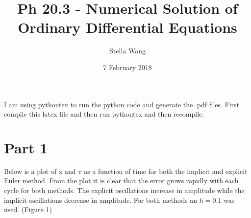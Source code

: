 \documentclass{article}
\title{Ph 20.3 - Numerical Solution of Ordinary Differential Equations}
\author{Stella Wang}
\date{ 7 February 2018}
\begin{document}
	\maketitle
I am using pythontex to run the python code and generate the .pdf files. First compile this latex file and then run pythontex and then recompile.

\section{Part 1}

Below is a plot of x and v as a function of time for both the implicit and explicit Euler method. From the plot it is clear that the error grows rapidly with each cycle for both methods. The explicit oscillations increase in amplitude while the implicit oscillations decrease in amplitude. For both methods an $h = 0.1$ was used. (Figure 1)
\end{document}
